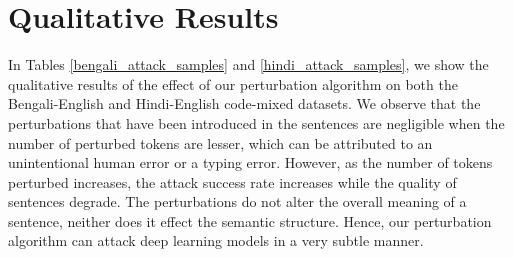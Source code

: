 \documentclass[sigconf]{acmart}
\begin{document}


\section{Qualitative Results}
In Tables \ref{bengali_attack_samples} and \ref{hindi_attack_samples}, we show the qualitative results of the effect of our perturbation algorithm on both the Bengali-English and Hindi-English code-mixed datasets. We observe that the perturbations that have been introduced in the sentences are negligible when the number of perturbed tokens are lesser, which can be attributed to an unintentional human error or a typing error. However, as the number of tokens perturbed increases, the attack success rate increases while the quality of sentences degrade. The perturbations do not alter the overall meaning of a sentence, neither does it effect the semantic structure. Hence, our perturbation algorithm can attack deep learning models in a very subtle manner.
\end{document}
